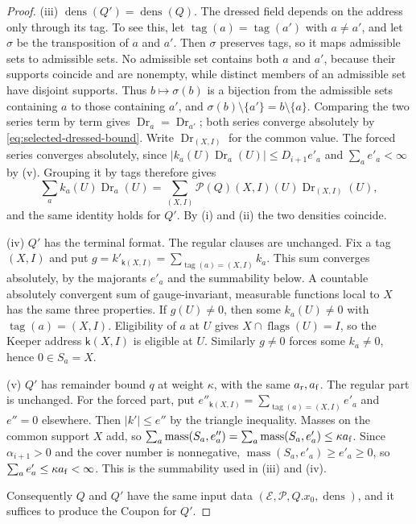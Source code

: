 \begin{proof}
(iii) $\operatorname{dens}(Q')=\operatorname{dens}(Q)$. The dressed
field depends on the address only through its tag. To see this, let
$\operatorname{tag}(a)=\operatorname{tag}(a')$ with $a\ne a'$, and let
$\sigma$ be the transposition of $a$ and $a'$. Then $\sigma$ preserves
tags, so it maps admissible sets to admissible sets. No admissible set
contains both $a$ and $a'$, because their supports coincide and are
nonempty, while distinct members of an admissible set have disjoint
supports. Thus $b\mapsto\sigma(b)$ is a bijection from the admissible
sets containing $a$ to those containing $a'$, and
$\sigma(b)\setminus\{a'\}=b\setminus\{a\}$. Comparing the two series
term by term gives $\operatorname{Dr}_a=\operatorname{Dr}_{a'}$; both
series converge absolutely by \eqref{eq:selected-dressed-bound}. Write
$\operatorname{Dr}_{(X,I)}$ for the common value. The forced series
converges absolutely, since
$|k_a(U)\operatorname{Dr}_a(U)|\le D_{i+1}e'_a$ and
$\sum_ae'_a<\infty$ by (v). Grouping it by tags therefore gives
\[
 \sum_ak_a(U)\operatorname{Dr}_a(U)
 =\sum_{(X,I)}\mathcal P(Q)(X,I)(U)\operatorname{Dr}_{(X,I)}(U),
\]
and the same identity holds for $Q'$. By (i) and (ii) the two
densities coincide.

(iv) $Q'$ has the terminal format. The regular clauses are unchanged.
Fix a tag $(X,I)$ and put $g=k'_{\mathsf k(X,I)}=\sum_{\operatorname{tag}(a)=(X,I)}k_a$.
This sum converges absolutely, by the majorants $e'_a$ and the
summability below. A countable absolutely convergent sum of
gauge-invariant, measurable functions local to $X$ has the same three
properties. If $g(U)\ne0$, then some $k_a(U)\ne0$ with
$\operatorname{tag}(a)=(X,I)$. Eligibility of $a$ at $U$ gives
$X\cap\operatorname{flags}(U)=I$, so the Keeper address $\mathsf k(X,I)$
is eligible at $U$. Similarly $g\ne0$ forces some $k_a\ne0$, hence
$0\in S_a=X$.

(v) $Q'$ has remainder bound $q$ at weight $\kappa$, with the same
$a_{\rm r},a_{\rm f}$. The regular part is unchanged. For the forced
part, put $e''_{\mathsf k(X,I)}=\sum_{\operatorname{tag}(a)=(X,I)}e'_a$
and $e''=0$ elsewhere. Then $|k'|\le e''$ by the triangle inequality.
Masses on the common support $X$ add, so
$\sum_a\operatorname{mass}(S_a,e''_a)=\sum_a\operatorname{mass}(S_a,e'_a)\le\kappa a_{\rm f}$.
Since $\alpha_{i+1}>0$ and the cover number is nonnegative,
$\operatorname{mass}(S_a,e'_a)\ge e'_a\ge0$, so
$\sum_ae'_a\le\kappa a_{\rm f}<\infty$. This is the summability used
in (iii) and (iv).

Consequently $Q$ and $Q'$ have the same input data
$(\mathcal E,\mathcal P,Q.x_0,\operatorname{dens})$, and it suffices to
produce the Coupon for $Q'$.


\end{proof}
